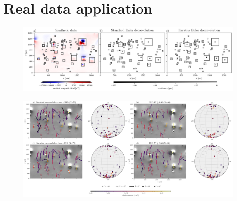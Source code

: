 \section{Real data application}

\begin{figure}[tb!]
  \centering
  \includegraphics[width=1\linewidth]{paper/figures/euler-comparion-real.png}
  \caption{
      }
  \label{real-data-euler}
\end{figure}

\begin{figure}[tb!]
  \centering
  \includegraphics[width=1\linewidth]{paper/figures/real-data-stereograms.png}
  \caption{
      }
  \label{real-data-stereograms}
\end{figure}
